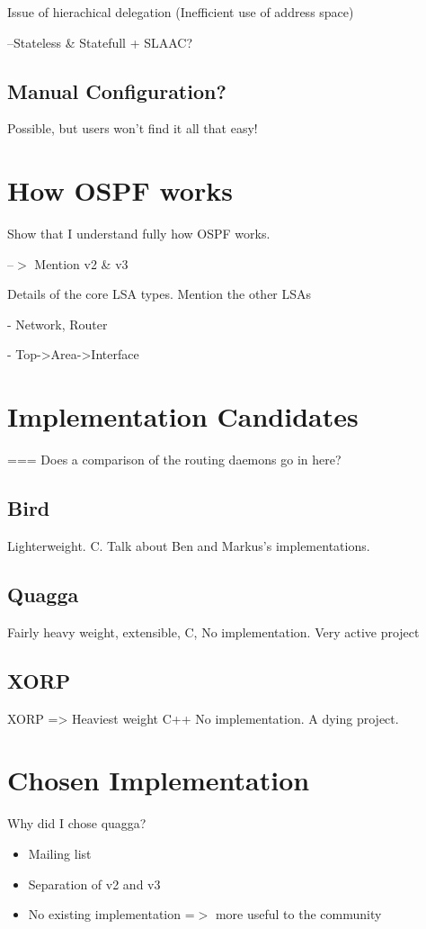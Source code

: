 \documentclass[12pt]{report}
\begin{document}
Issue of hierachical delegation (Inefficient use of address space)

--Stateless \& Statefull + SLAAC?

\subsection{Manual Configuration?}
Possible, but users won't find it all that easy!

\section{How OSPF works}
Show that I understand fully how OSPF works. 

--$>$ Mention v2 \& v3

Details of the core LSA types. Mention the other LSAs

- Network, Router 

- Top->Area->Interface

\section{Implementation Candidates}
=== Does a comparison of the routing daemons go in here?

\subsection{Bird}
Lighterweight. C. Talk about Ben and Markus's implementations.

\subsection{Quagga}
Fairly heavy weight, extensible, C, No implementation. Very active project

\subsection{XORP}
XORP => Heaviest weight C++ No implementation. A dying project.

\section{Chosen Implementation}
Why did I chose quagga?

\begin{itemize}
\item Mailing list
\item Separation of v2 and v3
\item No existing implementation =$>$ more useful to the community
\end{itemize}
\end{document}
